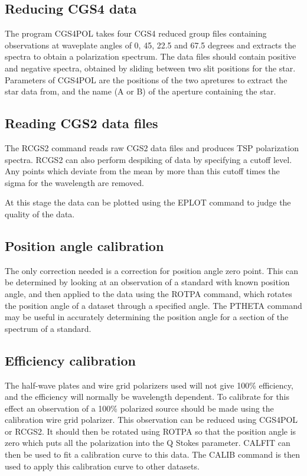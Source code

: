 \subsection{Reducing CGS4 data}

The program CGS4POL takes four CGS4 reduced group files containing observations at waveplate angles of 0, 45, 22.5 and 67.5 degrees and extracts the spectra to 
obtain a polarization spectrum. The data files should contain positive and negative spectra, obtained by sliding between two slit positions for the star.
Parameters of CGS4POL are the positions of the two apretures to extract the
star data from, and the name (A or B) of the aperture containing the star.

\subsection{Reading CGS2 data files}

The RCGS2 command reads raw CGS2 data files and produces TSP polarization
spectra. RCGS2 can also perform despiking of data by specifying a cutoff level.
Any points which deviate from the mean by more than this cutoff times the sigma
for the wavelength are removed.

At this stage the data can be plotted using the EPLOT command to judge the
quality of the data. 

\subsection{Position angle calibration}

The only correction needed is a correction for position angle zero point. This
can be determined by looking at an observation of a standard with known
position angle, and then applied to the data using the ROTPA command, which
rotates the position angle of a dataset through a specified angle. The PTHETA
command may be useful in accurately determining the position angle for a
section of the spectrum of a standard.

\subsection{Efficiency calibration}

The half-wave plates and wire grid polarizers used will not give 100\%
efficiency, and the efficiency will normally be wavelength dependent. To 
calibrate for this effect an observation of a 100\% polarized source should be
made using the calibration wire grid polarizer. This observation can be reduced
using CGS4POL or RCGS2. It should then be rotated using ROTPA so that the position angle
is zero which puts all the polarization into the Q Stokes parameter. CALFIT
can then be used to fit a calibration curve to this data. The CALIB command
is then used to apply this calibration curve to other datasets.


